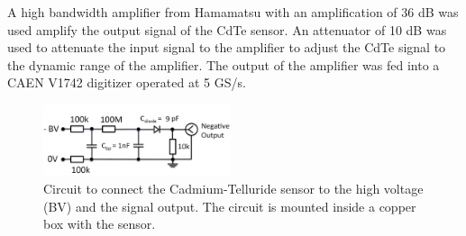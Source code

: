 A high bandwidth amplifier from Hamamatsu with an amplification of 36 dB was used amplify the output signal of the CdTe sensor.
An attenuator of 10 dB was used to attenuate the input signal to the amplifier to adjust the CdTe signal to the dynamic range of the amplifier.
The output of the amplifier was fed into a CAEN V1742 digitizer operated at 5 GS/s.
%
\begin{figure}[htbp] 
\centering
\includegraphics[width=0.49\textwidth]{figures/circuit_CdTe.png} 
\caption{Circuit to connect the Cadmium-Telluride sensor to the high voltage (BV) and the signal output. The circuit is mounted inside a copper box with the sensor.} 
\label{fig:cdtecircuit} 
\end{figure} 
%
